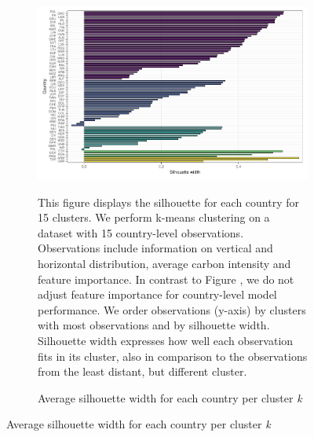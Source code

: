  \begin{figure}[ht!]\ContinuedFloat
   \centering
   \begin{subfigure}[b]{\textwidth}
   \centering
   \caption{Average silhouette width for each country per cluster \textit{k}} \label{fig:G2_silhouette}
   \includegraphics{Figures_Appendix/Figure_Silhouette_Clusters_1}
   \begin{subcaption2}
     This figure displays the silhouette for each country for 15 clusters. We perform k-means clustering on a dataset with 15 country-level observations. Observations include information on vertical and horizontal distribution, average carbon intensity and feature importance. In contrast to Figure , we do not adjust feature importance for country-level model performance. We order observations (y-axis) by clusters with most observations and by silhouette width. Silhouette width expresses how well each observation fits in its cluster, also in comparison to the observations from the least distant, but different cluster.
   \end{subcaption2}
   \end{subfigure}
 \end{figure}
 \clearpage